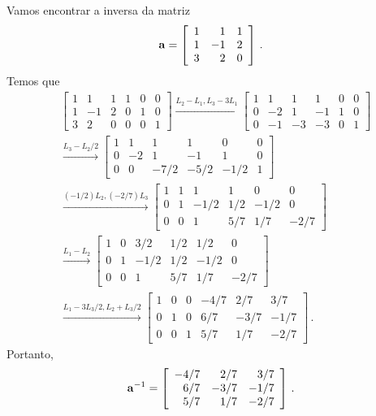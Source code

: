 \documentclass[12pt,a4paper]{article}
\newcommand{\dsqr}[1]{\left[#1\right]}
\theoremstyle{definition}
\begin{document}
Vamos encontrar a inversa da matriz
$${\bf a}=\dsqr{
  \begin{array}{rrr}
    1&1&1\\
    1&-1&2\\
    3&2&0
  \end{array}
}\,.$$ Temos que
\begin{equation*}
  \begin{split}
    &\dsqr{
      \begin{array}{rrrrrr}
        1&1&1&1&0&0\\
        1&-1&2&0&1&0\\
        3&2&0&0&0&1
      \end{array}
    }\xrightarrow{L_2-L_1,L_3-3L_1}\dsqr{
      \begin{array}{rrrrrr}
        1&1&1&1&0&0\\
        0&-2&1&-1&1&0\\
        0&-1&-3&-3&0&1
      \end{array}
    }\\
    &\xrightarrow{L_3-L_2/2}\dsqr{
      \begin{array}{rrrrrr}
        1&1&1&1&0&0\\
        0&-2&1&-1&1&0\\
        0&0&-7/2&-5/2&-1/2&1
      \end{array}
    }\\
    &\xrightarrow{(-1/2)L_2,(-2/7)L_3}\dsqr{
      \begin{array}{rrrrrr}
        1&1&1&1&0&0\\
        0&1&-1/2&1/2&-1/2&0\\
        0&0&1&5/7&1/7&-2/7
      \end{array}
    }\\
    &\xrightarrow{L_1-L_2}\dsqr{
      \begin{array}{rrrrrr}
        1&0&3/2&1/2&1/2&0\\
        0&1&-1/2&1/2&-1/2&0\\
        0&0&1&5/7&1/7&-2/7
      \end{array}
    }\\
    &\xrightarrow{L_1-3L_3/2,L_2+L_3/2}\dsqr{
      \begin{array}{rrrrrr}
        1&0&0&-4/7&2/7&3/7\\
        0&1&0&6/7&-3/7&-1/7\\
        0&0&1&5/7&1/7&-2/7
      \end{array}
    }\,.
  \end{split}
\end{equation*}
Portanto,
$${\bf a}^{-1}=\dsqr{
  \begin{array}{rrr}
    -4/7&2/7&3/7\\
    6/7&-3/7&-1/7\\
    5/7&1/7&-2/7
  \end{array}
}\,.$$
\end{document}
